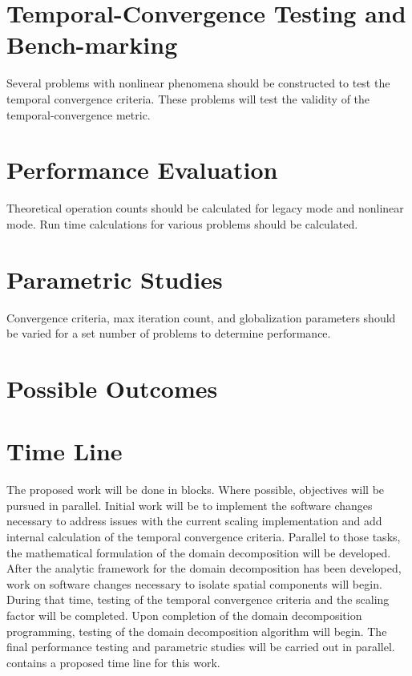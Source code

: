 \section{Temporal-Convergence Testing and Bench-marking}
\label{sect:proposal_temporal_testing}
Several problems with nonlinear phenomena should be constructed to test the temporal convergence criteria.
These problems will test the validity of the temporal-convergence metric.

\section{Performance Evaluation}
\label{sect:proposal_performance_evaluation}
Theoretical operation counts should be calculated for legacy mode and nonlinear mode.
Run time calculations for various problems should be calculated.

\section{Parametric Studies}
\label{sect:proposal_parametric_studies}
Convergence criteria, max iteration count, and globalization parameters should be varied for a set number of problems to determine performance.


\section{Possible Outcomes}
\label{sect:possible_outcomes}


\section{Time Line}
\label{sect:proposal_time_line}
The proposed work will be done in blocks.
Where possible, objectives will be pursued in parallel.
Initial work will be to implement the software changes necessary to address issues with the current scaling implementation and add internal calculation of the temporal convergence criteria.
Parallel to those tasks, the mathematical formulation of the domain decomposition will be developed.
After the analytic framework for the domain decomposition has been developed, work on software changes necessary to isolate spatial components will begin.
During that time, testing of the temporal convergence criteria and the scaling factor will be completed.
Upon completion of the domain decomposition programming, testing of the domain decomposition algorithm will begin.
The final performance testing and parametric studies will be carried out in parallel.
 contains a proposed time line for this work.

